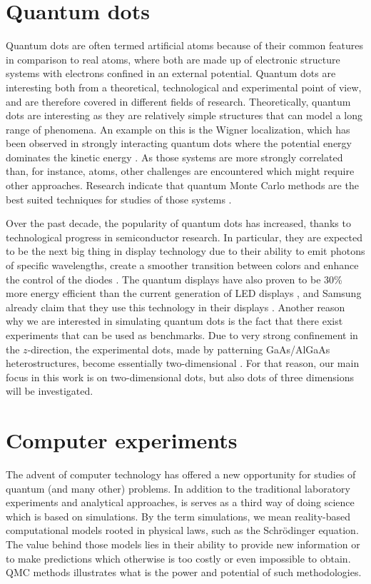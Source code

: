 \section{Quantum dots}
Quantum dots are often termed artificial atoms because of their common features in comparison to real atoms, where both are made up of electronic structure systems with electrons confined in an external potential. Quantum dots are interesting both from a theoretical, technological and experimental point of view, and are therefore covered in different fields of research. Theoretically, quantum dots are interesting as they are relatively simple structures that can model a long range of phenomena. An example on this is the Wigner localization, which has been observed in strongly interacting quantum dots where the potential energy dominates the kinetic energy \supercite{ghosal_incipient_2007, hogberget_quantum_2013}. As those systems are more strongly correlated than, for instance, atoms, other challenges are encountered which might require other approaches. Research indicate that quantum Monte Carlo methods are the best suited techniques for studies of those systems \supercite{ghosal_incipient_2007}.

Over the past decade, the popularity of quantum dots has increased, thanks to technological progress in semiconductor research. In particular, they are expected to be the next big thing in display technology due to their ability to emit photons of specific wavelengths, create a smoother transition between colors and enhance the control of the diodes \supercite{noauthor_samsung_nodate}. The quantum displays have also proven to be 30\% more energy efficient than the current generation of LED displays \supercite{manders_8.3:_2015}, and Samsung already claim that they use this technology in their displays \supercite{noauthor_samsung_nodate}. Another reason why we are interested in simulating quantum dots is the fact that there exist experiments that can be used as benchmarks. Due to very strong confinement in the $z$-direction, the experimental dots, made by patterning GaAs/AlGaAs heterostructures, become essentially two-dimensional \supercite{marzin_photoluminescence_1994,brunner_sharp-line_1994}. For that reason, our main focus in this work is on two-dimensional dots, but also dots of three dimensions will be investigated.

\section{Computer experiments}
The advent of computer technology has offered a new opportunity for studies of quantum (and many other) problems. In addition to the traditional laboratory experiments and analytical approaches, is serves as a third way of doing science which is based on simulations. By the term simulations, we mean reality-based computational models rooted in physical laws, such as the Schrödinger equation. The value behind those models lies in their ability to provide new information or to make predictions which otherwise is too costly or even impossible to obtain. QMC methods illustrates what is the power and potential of such methodologies.

